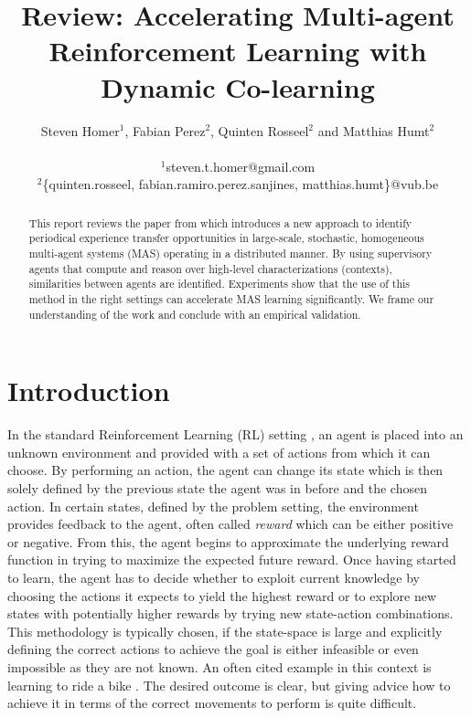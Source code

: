 \documentclass[letterpaper]{article}
\title{Review: Accelerating Multi-agent Reinforcement Learning
with Dynamic Co-learning}
\author{Steven Homer$^1$, Fabian Perez$^2$, Quinten Rosseel$^2$ and Matthias Humt$^2$ \\
\mbox{}\\
$^1$steven.t.homer@gmail.com\\
$^2$\{quinten.rosseel, fabian.ramiro.perez.sanjines, matthias.humt\}@vub.be}
\begin{document}
\maketitle

\begin{abstract} \label{sec:abstract}
 This report reviews the paper from \cite{garant2015accelerating} which introduces a new approach to identify periodical experience transfer opportunities in large-scale, stochastic, homogeneous multi-agent systems (MAS) operating in a distributed manner. By using supervisory agents that compute and reason over high-level characterizations (contexts), similarities between agents are identified. Experiments show that the use of this method in the right settings can accelerate MAS learning significantly. We frame our understanding of the work and conclude with an empirical validation.
\end{abstract}

\section{Introduction} \label{sec:introduction}
In the standard Reinforcement Learning (RL) setting \citep{sutton1998reinforcement}, an agent is placed into an unknown environment and provided with a set of actions from which it can choose. By performing an action, the agent can change its state which is then solely defined by the previous state the agent was in before and the chosen action. In certain states, defined by the problem setting, the environment provides feedback to the agent, often called \textit{reward} which can be either positive or negative. From this, the agent begins to approximate the underlying reward function in trying to maximize the expected future reward. Once having started to learn, the agent has to decide whether to exploit current knowledge by choosing the actions it expects to yield the highest reward or to explore new states with potentially higher rewards by trying new state-action combinations. This methodology is typically chosen, if the state-space is large and explicitly defining the correct actions to achieve the goal is either infeasible or even impossible as they are not known. An often cited example in this context is learning to ride a bike \citep{randlov1998learning}. The desired outcome is clear, but giving advice how to achieve it in terms of the correct movements to perform is quite difficult.
\end{document}

